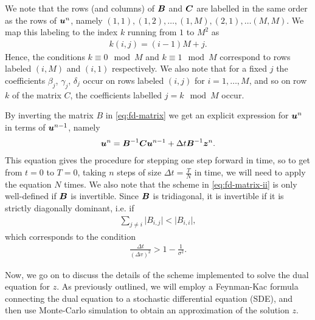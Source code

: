 \documentclass{article}  %
\begin{document}
We note that the rows (and columns) of $\boldsymbol{B}$ and $\boldsymbol{C}$ are labelled in the same order as the rows of $\boldsymbol{u}^n$, namely $(1,1),(1,2),\dots,(1,M),(2,1),\dots(M,M)$. We map this labeling to the index $k$ running from $1$ to $M^2$ as 
%
\begin{align}
    k(i,j) = (i-1)M + j.
\end{align}
%
Hence, the conditions $k\equiv 0 \mod M$ and $k\equiv 1 \mod M$ correspond to rows labeled $(i,M)$ and $(i,1)$ respectively. We also note that for a fixed $j$ the coefficients $\beta_j$, $\gamma_j$, $\delta_j$ occur on rows labeled $(i,j)$ for $i=1,\dots,M$, and so on row $k$ of the matrix $C$, the coefficients labelled $j = k \mod M$ occur.

By inverting the matrix $B$ in \autoref{eq:fd-matrix} we get an explicit expression for $\boldsymbol{u}^n$ in terms of $\boldsymbol{u}^{n-1}$, namely
%
\begin{align} 
    \label{eq:fd-matrix-ii}
    \boldsymbol{u}^n = \boldsymbol{B}^{-1}\boldsymbol{C}\boldsymbol{u}^{n-1} + \Delta t \boldsymbol{B}^{-1}\boldsymbol{z}^n.
\end{align}
%
This equation gives the procedure for stepping one step forward in time, so to get from $t=0$ to $T=0$, taking $n$ steps of size $\Delta t = \frac{T}{N}$ in time, we will need to apply the equation $N$ times. We also note that the scheme in \autoref*{eq:fd-matrix-ii} is only well-defined if $\boldsymbol{B}$ is invertible. Since $\boldsymbol{B}$ is tridiagonal, it is invertible if it is strictly diagonally dominant, i.e. if
%
\begin{align} 
    \sum_{j\neq i} \lvert B_{i,j} \rvert < \lvert B_{i,i} \rvert,  
\end{align}
%
which corresponds to the condition 
%
\begin{align}
    \frac{\Delta t}{(\Delta v)^2} > 1 - \frac{1}{\sigma^2}.
\end{align}
%

Now, we go on to discuss the details of the scheme implemented to solve the dual equation for $z$. As previously outlined, we will employ a Feynman-Kac formula connecting the dual equation to a stochastic differential equation (SDE), and then use Monte-Carlo simulation to obtain an approximation of the solution $z$.

% 
% 
\nocite{*}
\printbibliography
%
\end{document}
